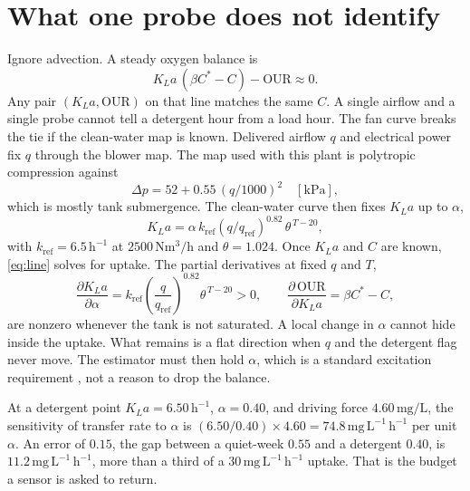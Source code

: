 \documentclass[11pt,a4paper]{article}
\begin{document}
\section{What one probe does not identify}

Ignore advection. A steady oxygen balance is
\begin{equation}
\label{eq:line}
K_La\,(\beta C^{*}-C)-\mathrm{OUR}\approx 0.
\end{equation}
Any pair \((K_La,\mathrm{OUR})\) on that line matches the same \(C\). A single airflow and a single probe cannot tell a detergent hour from a load hour. The fan curve breaks the tie if the clean-water map is known. Delivered airflow \(q\) and electrical power fix \(q\) through the blower map. The map used with this plant is polytropic compression against
\begin{equation}
\Delta p = 52 + 0.55\,(q/1000)^{2}\quad[\mathrm{kPa}],
\end{equation}
which is mostly tank submergence. The clean-water curve then fixes \(K_La\) up to \(\alpha\),
\begin{equation}
\label{eq:kla}
K_La=\alpha\,k_{\mathrm{ref}}(q/q_{\mathrm{ref}})^{0.82}\,\theta^{\,T-20},
\end{equation}
with \(k_{\mathrm{ref}}=6.5\,\mathrm{h^{-1}}\) at \(2500\,\mathrm{Nm^{3}/h}\) and \(\theta=1.024\). Once \(K_La\) and \(C\) are known, \eqref{eq:line} solves for uptake. The partial derivatives at fixed \(q\) and \(T\),
\begin{equation}
\frac{\partial K_La}{\partial\alpha}
=
k_{\mathrm{ref}}\left(\frac{q}{q_{\mathrm{ref}}}\right)^{0.82}\theta^{\,T-20}>0,
\qquad
\frac{\partial\,\mathrm{OUR}}{\partial K_La}
=
\beta C^{*}-C,
\end{equation}
are nonzero whenever the tank is not saturated. A local change in \(\alpha\) cannot hide inside the uptake. What remains is a flat direction when \(q\) and the detergent flag never move. The estimator must then hold \(\alpha\), which is a standard excitation requirement \cite{ljung1999}, not a reason to drop the balance.

At a detergent point \(K_La=6.50\,\mathrm{h^{-1}}\), \(\alpha=0.40\), and driving force \(4.60\,\mathrm{mg/L}\), the sensitivity of transfer rate to \(\alpha\) is \((6.50/0.40)\times 4.60=74.8\,\mathrm{mg\,L^{-1}\,h^{-1}}\) per unit \(\alpha\). An error of \(0.15\), the gap between a quiet-week \(0.55\) and a detergent \(0.40\), is \(11.2\,\mathrm{mg\,L^{-1}\,h^{-1}}\), more than a third of a \(30\,\mathrm{mg\,L^{-1}\,h^{-1}}\) uptake. That is the budget a sensor is asked to return.
\end{document}
